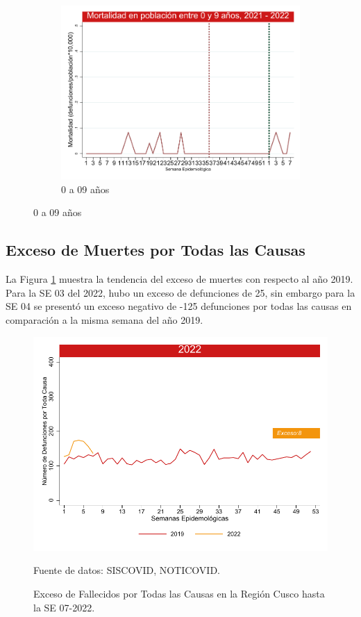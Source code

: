 \documentclass[12pt,a4paper,openany]{book}
\begin{document}
\begin{figure}[h]
	\vspace{10mm}
	\begin{subfigure}[b]{0.45\textwidth}
		\centering
		\includegraphics[width=\textwidth]{../figuras/mortalidad_edad_0.pdf}
		\caption{0 a 09 años}
	\end{subfigure}
\end{figure}
\clearpage	
	\subsection*{Exceso de Muertes por Todas las Causas}
\noindent La Figura \ref{fig:exceso_regional} muestra la tendencia del exceso de muertes con respecto al año 2019. Para la SE 03 del 2022, hubo un exceso de defunciones de 25, sin embargo para la SE 04 se presentó un exceso negativo de -125 defunciones por todas las causas en comparación a la misma semana del año 2019.  

	\begin{figure}[h]
	\caption{Exceso de Fallecidos por Todas las Causas en la Región Cusco hasta la SE 07-2022.}\label{fig:exceso_regional}
	\begin{center}
		\includegraphics[width=0.85\linewidth]{../figuras/exceso_region_2022.pdf}
	\end{center}
	{\footnotesize {Fuente de datos: SISCOVID, NOTICOVID.}}
	\end{figure}
\clearpage
\end{document}
